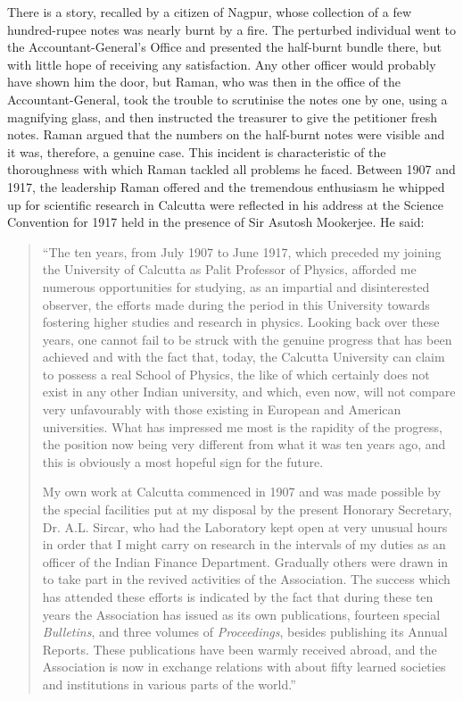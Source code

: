 There is a story, recalled by a citizen of Nagpur, whose collection of a few hundred-rupee notes was nearly burnt by a fire. The perturbed individual went to the Accountant-General's Office and presented the half-burnt bundle there, but with little hope of receiving any satisfaction. Any other officer would probably have shown him the door, but Raman, who was then in the office of the Accountant-General, took the trouble to scrutinise the notes one by one, using a magnifying glass, and then instructed the treasurer to give the petitioner fresh notes. Raman argued that the numbers on the half-burnt notes were visible and it was, therefore, a genuine case. This incident is characteristic of the thoroughness with which Raman tackled all problems he faced. Between 1907 and 1917, the leadership Raman offered and the tremendous enthusiasm he whipped up for scientific research in Calcutta were reflected in his address at the Science Convention for 1917 held in the presence of Sir Asutosh Mookerjee. He said:
\begin{quote}
{\fontsize{10pt}{12pt}\selectfont
``The ten years, from July 1907 to June 1917, which preceded my joining the University of Calcutta as Palit Professor of Physics, afforded me numerous opportunities for studying, as an impartial and disinterested observer, the efforts made during the period in this University towards fostering higher studies and research in physics. Looking back over these years, one cannot fail to be struck with the genuine progress that has been achieved and with the fact that, today, the Calcutta University can claim to possess a real School of Physics, the like of which certainly does not exist in any other Indian university, and which, even now, will not compare very unfavourably with those existing in European and American universities. What has impressed me most is the rapidity of the progress, the position now being very different from what it was ten years ago, and this is obviously a most hopeful sign for the future.}\relax

{\fontsize{10pt}{12pt}\selectfont
My own work at Calcutta commenced in 1907 and was made possible by the special facilities put at my disposal by the present Honorary Secretary, Dr. A.L. Sircar, who had the Laboratory kept open at very unusual hours in order that I might carry on research in the intervals of my duties as an officer of the Indian Finance Department. Gradually others were drawn in to take part in the revived activities of the Association. The success which has attended these efforts is indicated by the fact that during these ten years the Association has issued as its own publications, fourteen special {\em Bulletins}, and three volumes of {\em Proceedings}, besides publishing its Annual Reports. These publications have been warmly received abroad, and the Association is now in exchange relations with about fifty learned societies and institutions in various parts of the world.''}\relax
\end{quote}

